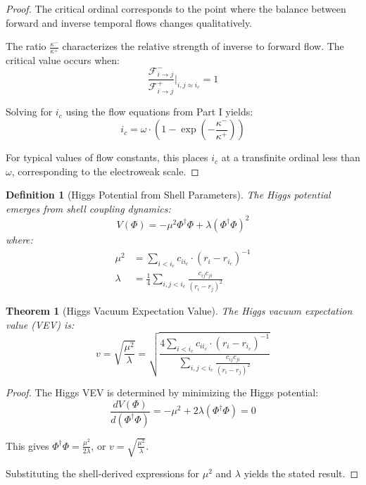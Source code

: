 \documentclass[12pt,a4paper]{article}
\newtheorem{theorem}{Theorem}[section]
\newtheorem{definition}{Definition}[section]
\newcommand{\F}{\mathcal{F}}
\begin{document}
\begin{proof}
The critical ordinal corresponds to the point where the balance between forward and inverse temporal flows changes qualitatively.

The ratio $\frac{\kappa^-}{\kappa^+}$ characterizes the relative strength of inverse to forward flow. The critical value occurs when:
\begin{equation}
\frac{\F^-_{i \to j}}{\F^+_{i \to j}} \bigg|_{i,j \approx i_c} = 1
\end{equation}

Solving for $i_c$ using the flow equations from Part I yields:
\begin{equation}
i_c = \omega \cdot \left(1 - \exp\left(-\frac{\kappa^-}{\kappa^+}\right)\right)
\end{equation}

For typical values of flow constants, this places $i_c$ at a transfinite ordinal less than $\omega$, corresponding to the electroweak scale.
\end{proof}

\begin{definition}[Higgs Potential from Shell Parameters]
\label{def:higgs-potential}
The Higgs potential emerges from shell coupling dynamics:
\begin{equation}
V(\Phi) = -\mu^2 \Phi^\dagger\Phi + \lambda(\Phi^\dagger\Phi)^2
\end{equation}
where:
\begin{align}
\mu^2 &= \sum_{i < i_c} c_{ii_c} \cdot (r_i - r_{i_c})^{-1} \\
\lambda &= \frac{1}{4}\sum_{i,j < i_c} \frac{c_{ij}c_{ji}}{(r_i-r_j)^2}
\end{align}
\end{definition}

\begin{theorem}[Higgs Vacuum Expectation Value]
\label{thm:higgs-vev}
The Higgs vacuum expectation value (VEV) is:
\begin{equation}
v = \sqrt{\frac{\mu^2}{\lambda}} = \sqrt{\frac{4\sum_{i < i_c} c_{ii_c} \cdot (r_i - r_{i_c})^{-1}}{\sum_{i,j < i_c} \frac{c_{ij}c_{ji}}{(r_i-r_j)^2}}}
\end{equation}
\end{theorem}

\begin{proof}
The Higgs VEV is determined by minimizing the Higgs potential:
\begin{equation}
\frac{dV(\Phi)}{d(\Phi^\dagger\Phi)} = -\mu^2 + 2\lambda(\Phi^\dagger\Phi) = 0
\end{equation}

This gives $\Phi^\dagger\Phi = \frac{\mu^2}{2\lambda}$, or $v = \sqrt{\frac{\mu^2}{\lambda}}$.

Substituting the shell-derived expressions for $\mu^2$ and $\lambda$ yields the stated result.
\end{proof}
\end{document}
